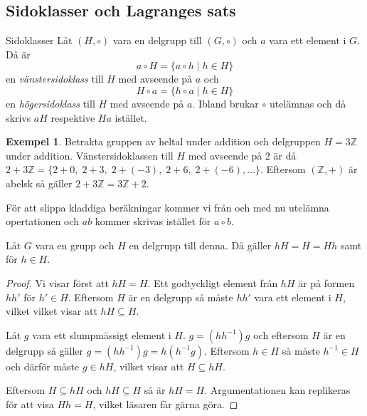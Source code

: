 \documentclass{article}
\theoremstyle{definition}
\newtheorem{exmp}[thm]{Exempel}
\begin{document}
\subsection{Sidoklasser och Lagranges sats}
\begin{mydef}{}{Sidoklasser}
  Låt $(H, \circ)$ vara en delgrupp till $(G, \circ)$ och $a$ vara ett element i $G$. 
  Då är
  \[a \circ H = \{a \circ h \; | \; h \in H\}\]
  en \textit{vänstersidoklass} till $H$ med avseende på $a$ och 
  \[H \circ a = \{h \circ a \; | \; h \in H\}\]
  en \textit{högersidoklass} till $H$ med avseende på $a$. Ibland brukar $\circ$ utelämnas 
  och då skrivs $aH$ respektive $Ha$ istället.
\end{mydef}
\begin{exmp}
  Betrakta gruppen av heltal under addition och delgruppen $H = 3 \mathbb{Z}$ under addition. 
  Vänstersidoklassen till $H$ med avseende på 2 är då 
  $2 + 3 \mathbb{Z} = \{ 2+0, \;2+3, \;2+(-3), \;2+6, \;2+(-6), \ldots\}$.
  Eftersom $(\mathbb{Z}, +)$ är abelsk så gäller $2 + 3 \mathbb{Z} = 3 \mathbb{Z} + 2$. 
\end{exmp}

För att slippa kladdiga beräkningar kommer vi från och med nu utelämna opertationen och $ab$ kommer
skrivas istället för $a \circ b$.

\hypertarget{lemma4.1}{}
\begin{mylemma}{}{}
  Låt $G$ vara en grupp och $H$ en delgrupp till denna. Då gäller $hH = H = Hh$ samt 
  för $h \in H$.
\end{mylemma}
\begin{proof}
  Vi visar först att $hH = H$. 
  Ett godtyckligt element från $hH$ är på formen $hh'$ för $h' \in H$. Eftersom $H$ är 
  en delgrupp så måste $hh'$ vara ett element i $H$, vilket vilket visar att $hH \subseteq H$.

  Låt $g$ vara ett slumpmässigt element i $H$. $g = (hh^{-1})g$ och eftersom 
  $H$ är en delgrupp så gäller $g = (hh^{-1})g = h(h^{-1}g)$. Eftersom $h \in H$ så måste 
  $h^{-1} \in H$ och därför måste $g \in hH$, vilket visar att $H \subseteq hH$.

  Eftersom $H \subseteq hH$ och $hH \subseteq H$ så är $hH = H$. Argumentationen kan 
  replikeras för att visa $Hh = H$, vilket läsaren får gärna göra. 
\end{proof}
\end{document}
